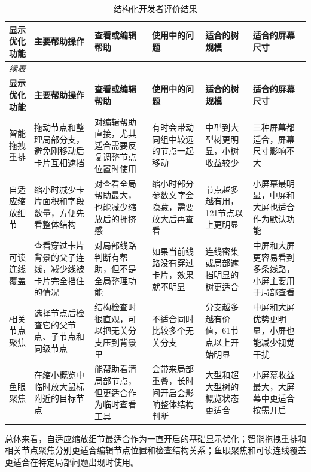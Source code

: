 \documentclass[11pt,a4paper,oneside,extrafontsizes]{memoir}
\begin{document}
\begin{center}

\begin{longtable}{@{}p{} p{} p{} p{} p{} p{}@{}}
\caption{结构化开发者评价结果}\label{tab:developer-evaluation}\\
\toprule
\textbf{显示优化功能} & \textbf{主要帮助操作} & \textbf{查看或编辑帮助} & \textbf{使用中的问题} & \textbf{适合的树规模} & \textbf{适合的屏幕尺寸} \\
\midrule
\endfirsthead
\multicolumn{6}{l}{\itshape 续表}\\
\toprule
\textbf{显示优化功能} & \textbf{主要帮助操作} & \textbf{查看或编辑帮助} & \textbf{使用中的问题} & \textbf{适合的树规模} & \textbf{适合的屏幕尺寸} \\
\midrule
\endhead
智能拖拽重排 & 拖动节点和整理局部分支，避免刚移动后卡片互相遮挡 & 对编辑帮助直接，尤其适合需要反复调整节点位置时使用 & 有时会带动同组中较远的节点一起移动 & 中型到大型树更明显，小树收益较少 & 三种屏幕都适合，屏幕尺寸影响不大 \\
自适应缩放细节 & 缩小时减少卡片面积和字段数量，方便先看整体结构 & 对查看全局帮助最大，也能减少缩放后的拥挤感 & 缩小时部分参数文字会隐藏，需要放大后再查看 & 节点越多越有用，121节点以上更明显 & 小屏幕最明显，中屏和大屏也适合作为默认功能 \\
可读连线覆盖 & 查看穿过卡片背景的父子连线，减少线被卡片完全挡住的情况 & 对局部线路判断有帮助，但不是全局整理功能 & 如果当前线路没有穿过卡片，效果就不明显 & 连线密集或局部遮挡明显的树更适合 & 中屏和大屏更容易看到多条线路，小屏主要用于局部查看 \\
相关节点聚焦 & 选择节点后检查它的父节点、子节点和同级节点 & 结构检查时很直观，可以把无关分支压到背景里 & 不适合同时比较多个无关分支 & 分支越多越有价值，61节点以上开始明显 & 中屏和大屏优势更明显，小屏也能减少视觉干扰 \\
鱼眼聚焦 & 在缩小概览中临时放大鼠标附近的目标节点 & 能帮助看清局部节点，但更适合作为临时查看工具 & 会带来局部重叠，长时间开启会影响整体结构判断 & 大型和超大型树的概览状态更适合 & 小屏幕收益最大，大屏幕中更适合按需开启 \\
\bottomrule
\end{longtable}
\end{center}

总体来看，自适应缩放细节最适合作为一直开启的基础显示优化；智能拖拽重排和相关节点聚焦分别更适合编辑节点位置和检查结构关系；鱼眼聚焦和可读连线覆盖更适合在特定局部问题出现时使用。
\end{document}
